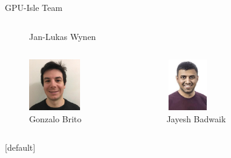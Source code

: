 \documentclass{beamer}
\begin{document}
\begin{frame}{GPU-Isle Team}
\begin{columns}
\begin{column}{0.25\textwidth}
\begin{figure}
\caption{Jan-Lukas Wynen}
\end{figure}
\end{column}
\end{columns}
\begin{columns}
\begin{column}{0.25\textwidth}
\begin{figure}
\includegraphics[width=6em,height=6em]{HackathonSlides/Pictures/Gonzalo.jpg}
\vspace*{-2em}
\caption{Gonzalo Brito}
\end{figure}
\end{column}
\begin{column}{0.25\textwidth}
\begin{figure}
\includegraphics[width=5em,height=6em]{HackathonSlides/Pictures/jayesh.jpg}
\vspace*{-2em}
\caption{Jayesh Badwaik}
\end{figure}
\end{column}
\begin{column}{0.5\textwidth}

\end{column}
\end{columns}
\end{frame}
[default]
\end{document}
